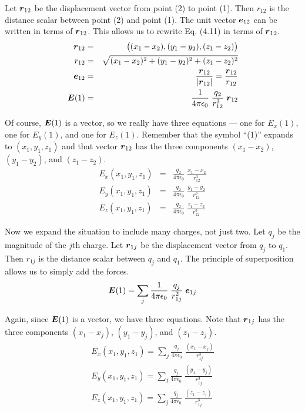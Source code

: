 Let $\boldsymbol{r}_{12}$ be the displacement vector from point (2) to point (1).
Then $r_{12}$ is the distance scalar between point (2) and point (1).
The unit vector $\boldsymbol{e}_{12}$ can be written in terms of $\boldsymbol{r}_{12}$.
This allows us to rewrite Eq. (4.11) in terms of $\boldsymbol{r}_{12}$.
\begin{eqnarray*}
  \boldsymbol{r}_{12} &=& \big((x_1 - x_2), (y_1 - y_2), (z_1 - z_2)\big) \\
  r_{12} &=& \sqrt{(x_1 - x_2)^2 + (y_1 - y_2)^2 + (z_1 - z_2)^2} \\
  \boldsymbol{e}_{12} &=& \frac{\boldsymbol{r}_{12}}{|\boldsymbol{r}_{12}|} = \frac{\boldsymbol{r}_{12}}{r_{12}} \\
  \boldsymbol{E}(1) &=& \frac{1}{4\pi\epsilon_0} \; \frac{q_2}{r^3_{12}} \; \boldsymbol{r}_{12}
\end{eqnarray*}

Of course, $\boldsymbol{E}(1)$ is a vector, so we really have three equations ---
one for $E_x(1)$, one for $E_y(1)$, and one for $E_z(1)$.
Remember that the symbol ``(1)'' expands to $(x_1,y_1,z_1)$ and 
that vector $\boldsymbol{r}_{12}$ has the three components
$(x_1 - x_2)$, $(y_1 - y_2)$, and $(z_1 - z_2)$.
\begin{eqnarray}
  E_x (x_1,y_1,z_1) &=& \frac{q_2}{4\pi\epsilon_0} \; \frac{x_1 - x_2}{r^3_{12}} \\
  E_y (x_1,y_1,z_1) &=& \frac{q_2}{4\pi\epsilon_0} \; \frac{y_1 - y_2}{r^3_{12}} \nonumber\\
  E_z (x_1,y_1,z_1) &=& \frac{q_2}{4\pi\epsilon_0} \; \frac{z_1 - z_2}{r^3_{12}} \nonumber
\end{eqnarray}

Now we expand the situation to include many charges, not just two.
Let $q_j$ be the magnitude of the $j$th charge.
Let $\boldsymbol{r}_{1j}$ be the displacement vector from $q_j$ to $q_1$.
Then $r_{1j}$ is the distance scalar between $q_j$ and $q_1$.
The principle of superposition allows us to simply add the forces.
\begin{equation}
  \boldsymbol{E}(1) = \sum_j \frac{1}{4\pi\epsilon_0} \; \frac{q_j}{r^2_{1j}} \; \boldsymbol{e}_{1j}
\end{equation}

Again, since $\boldsymbol{E}(1)$ is a vector, we have three equations.
Note that $\boldsymbol{r}_{1j}$ has the three components $(x_1 - x_j)$, $(y_1 - y_j)$, and $(z_1 - z_j)$.
\begin{eqnarray}
  E_x (x_1,y_1,z_1) = \sum_j \frac{q_j}{4\pi\epsilon_0} \; \frac{(x_1 - x_j)}{r^3_{1j}} \\
  E_y (x_1,y_1,z_1) = \sum_j \frac{q_j}{4\pi\epsilon_0} \; \frac{(y_1 - y_j)}{r^3_{1j}} \nonumber\\
  E_z (x_1,y_1,z_1) = \sum_j \frac{q_j}{4\pi\epsilon_0} \; \frac{(z_1 - z_j)}{r^3_{1j}} \nonumber
\end{eqnarray}

